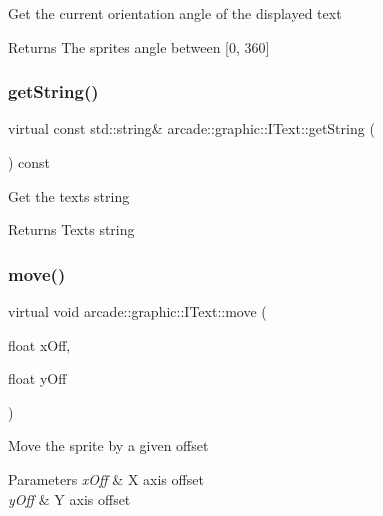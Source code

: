 Get the current orientation angle of the displayed text \begin{DoxyReturn}{Returns}
The sprite\textquotesingle{}s angle between \mbox{[}0, 360\mbox{]} 
\end{DoxyReturn}
\mbox{\label{classarcade_1_1graphic_1_1_i_text_a15a5ef9ed961cd8f4c596f09ce79f694}} 
\subsubsection{\texorpdfstring{getString()}{getString()}}
{\footnotesize\ttfamily virtual const std\+::string\& arcade\+::graphic\+::\+I\+Text\+::get\+String (\begin{DoxyParamCaption}{ }\end{DoxyParamCaption}) const\hspace{0.3cm}{\ttfamily [pure virtual]}}

Get the text\textquotesingle{}s string \begin{DoxyReturn}{Returns}
Text\textquotesingle{}s string 
\end{DoxyReturn}
\mbox{\label{classarcade_1_1graphic_1_1_i_text_a1854dd1c560220cba75f132bbcb2c96e}} 
\subsubsection{\texorpdfstring{move()}{move()}}
{\footnotesize\ttfamily virtual void arcade\+::graphic\+::\+I\+Text\+::move (\begin{DoxyParamCaption}\item[{float}]{x\+Off,  }\item[{float}]{y\+Off }\end{DoxyParamCaption})\hspace{0.3cm}{\ttfamily [pure virtual]}}

Move the sprite by a given offset 
\begin{DoxyParams}{Parameters}
{\em x\+Off} & X axis offset \\
\hline
{\em y\+Off} & Y axis offset \\
\hline
\end{DoxyParams}
\mbox{\label{classarcade_1_1graphic_1_1_i_text_ac15854bcc1c009286a4148ae53e7aa99}} 

